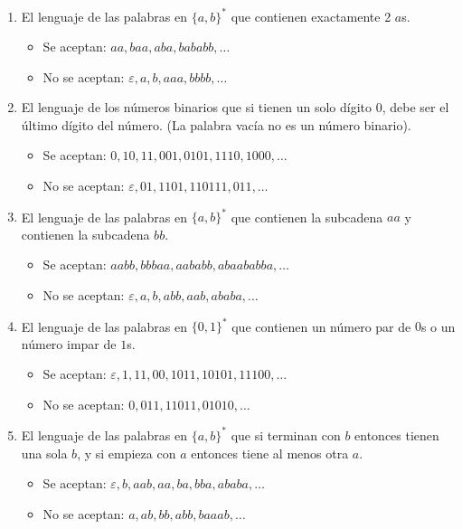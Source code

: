 \documentclass[]{book}
\theoremstyle{definition}
\begin{document}
\begin{enumerate}
	\itemsep3.5ex
	\item El lenguaje de las palabras en $\{a,b\}^*$ que contienen exactamente 2 $a$s.
	\begin{itemize}
		\item Se aceptan: $aa, baa, aba, bababb, \dots$
		\item No se aceptan: $\varepsilon , a, b, aaa, bbbb, \dots$
	\end{itemize}
	
	\item El lenguaje de los números binarios que si tienen un solo dígito $0$, debe ser el último dígito del número. (La palabra vacía no es un número binario).
	\begin{itemize}
		\item Se aceptan: $0, 10, 11, 001, 0101, 1110, 1000, \dots$
		\item No se aceptan: $\varepsilon , 01, 1101, 110111, 011, \dots$
	\end{itemize}

	\item El lenguaje de las palabras en $\{a, b\}^*$ que contienen la subcadena $aa$ y contienen la subcadena $bb$.
	\begin{itemize}
		\item Se aceptan: $aabb, bbbaa, aababb, abaababba, \dots$
		\item No se aceptan: $\varepsilon , a, b, abb, aab, ababa, \dots$
	\end{itemize}

	\item El lenguaje de las palabras en $\{0,1 \}^*$ que contienen un número par de $0$s o un número impar de $1$s.
	\begin{itemize}
		\item Se aceptan: $\varepsilon , 1, 11, 00, 1011, 10101, 11100, \dots$
		\item No se aceptan: $0, 011, 11011, 01010, \dots$
	\end{itemize}

	\item El lenguaje de las palabras en $\{a, b\}^*$ que si terminan con $b$ entonces tienen una sola $b$, y si empieza con $a$ entonces tiene al menos otra $a$.
	\begin{itemize}
		\item Se aceptan: $\varepsilon , b, aab, aa, ba, bba, ababa, \dots$
		\item No se aceptan: $a, ab, bb, abb, baaab, \dots$
	\end{itemize}
\end{enumerate}
\end{document}
